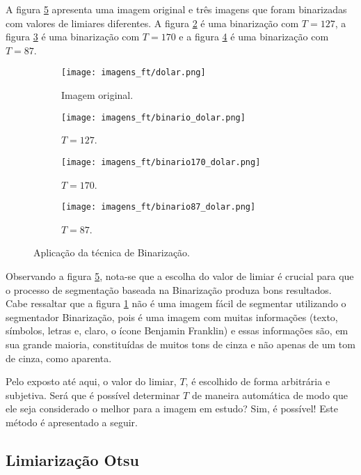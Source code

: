 A figura \ref{fig:binario} apresenta uma imagem original e três imagens que foram binarizadas com valores de limiares diferentes. A figura \ref{fig:dolar_binario127} é uma binarização com $T = 127$, a figura \ref{fig:dolar_binario170} é uma binarização com $T = 170$ e a figura \ref{fig:dolar_binario87} é uma binarização com $T = 87$. 

\begin{figure}[h]
	\centering
	\begin{subfigure}[b]{0.45\textwidth}
		\centering
		\texttt{[image: imagens\_ft/dolar.png]}
		\caption{Imagem original.}
		\label{fig:dolar_original}
	\end{subfigure}
	\hfill
	\begin{subfigure}[b]{0.45\textwidth}
		\centering
		\texttt{[image: imagens\_ft/binario\_dolar.png]}
		\caption{$T = 127$.}
		\label{fig:dolar_binario127}
	\end{subfigure}
	\hfill
	\begin{subfigure}[b]{0.45\textwidth}
		\centering
		\texttt{[image: imagens\_ft/binario170\_dolar.png]}
		\caption{$T = 170$.}
		\label{fig:dolar_binario170}
	\end{subfigure}
	\hfill
	\begin{subfigure}[b]{0.45\textwidth}
		\centering
		\texttt{[image: imagens\_ft/binario87\_dolar.png]}
		\caption{$T = 87$.}
		\label{fig:dolar_binario87}
	\end{subfigure}
	\caption{Aplicação da técnica de Binarização.}
	\label{fig:binario}
\end{figure}

Observando a figura \ref{fig:binario}, nota-se que a escolha do valor de limiar é crucial para que o processo de segmentação baseada na Binarização produza bons resultados. Cabe ressaltar que a figura \ref{fig:dolar_original} não é uma imagem fácil de segmentar utilizando o segmentador Binarização, pois é uma imagem com muitas informações (texto, símbolos, letras e, claro, o ícone Benjamin Franklin) e essas informações são, em sua grande maioria, constituídas de muitos tons de cinza e não apenas de um tom de cinza, como aparenta.

Pelo exposto até aqui, o valor do limiar, $T$, é escolhido de forma arbitrária e subjetiva. Será que é possível determinar $T$ de maneira automática de modo que ele seja considerado o melhor para a imagem em estudo? Sim, é possível! Este método é apresentado a seguir.

\subsection{Limiarização Otsu}

